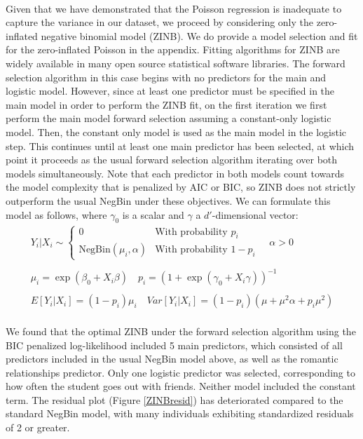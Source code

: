 \documentclass[12pt, titlepage]{article}
\begin{document}
	\paragraph{} Given that we have demonstrated that the Poisson regression is inadequate to capture the variance in our dataset, we proceed by considering only the zero-inflated negative binomial model (ZINB). We do provide a model selection and fit for the zero-inflated Poisson in the appendix. Fitting algorithms for ZINB are widely available in many open source statistical software libraries. The forward selection algorithm in this case begins with no predictors for the main and logistic model. However, since at least one predictor must be specified in the main model in order to perform the ZINB fit, on the first iteration we first perform the main model forward selection assuming a constant-only logistic model. Then, the constant only model is used as the main model in the logistic step. This continues until at least one main predictor has been selected, at which point it proceeds as the usual forward selection algorithm iterating over both models simultaneously. Note that each predictor in both models count towards the model complexity that is penalized by AIC or BIC, so ZINB does not strictly outperform the usual NegBin under these objectives. We can formulate this model as follows, where $\gamma_0$ is a scalar and $\gamma$ a $d'$-dimensional vector:
	\begin{gather*}
	Y_i|X_i \sim \begin{cases}
	0 & \text{With probability } p_i \\
	\text{NegBin}(\mu_i, \alpha)  & \text{With probability } 1-p_i
	\end{cases} \quad \alpha > 0
	\\ \\
	\mu_i = \exp(\beta_0 + X_i\beta) \quad p_i = (1 + \exp(\gamma_0 + X_i\gamma))^{-1}  \\ \\  
	E[Y_i|X_i] = (1-p_i)\mu_i \quad Var[Y_i|X_i] = (1-p_i)(\mu + \mu^2\alpha + p_i\mu^2)
	\end{gather*}
	
	\paragraph{} We found that the optimal ZINB under the forward selection algorithm using the BIC penalized log-likelihood included 5 main predictors, which consisted of all predictors included in the usual NegBin model above, as well as the romantic relationships predictor. Only one logistic predictor was selected, corresponding to how often the student goes out with friends. Neither model included the constant term. The residual plot (Figure \ref{ZINBresid}) has deteriorated compared to the standard NegBin model, with many individuals exhibiting standardized residuals of 2 or greater.
\end{document}
